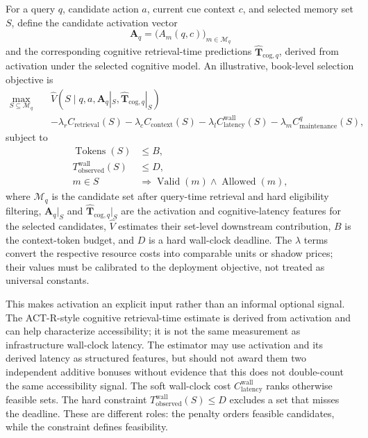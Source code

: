 For a query \(q\), candidate action \(a\), current cue context \(c\), and selected memory set \(S\), define the candidate activation vector
\[
  \mathbf A_q=\bigl(A_m(q,c)\bigr)_{m\in\mathcal M_q}
\]
and the corresponding cognitive retrieval-time predictions
\(\widehat{\mathbf T}_{\mathrm{cog},q}\), derived from activation under the selected cognitive model. An illustrative, book-level selection objective is
\begin{equation}
  \begin{split}
  \max_{S\subseteq\mathcal{M}_{q}}\quad
  &\widehat{V}\!\left(S\mid q,a,\mathbf A_q|_S,
       \widehat{\mathbf T}_{\mathrm{cog},q}|_S\right)\\
  &-\lambda_r C_{\mathrm{retrieval}}(S)
   -\lambda_c C_{\mathrm{context}}(S)
   -\lambda_l C_{\mathrm{latency}}^{\mathrm{wall}}(S)
   -\lambda_m C_{\mathrm{maintenance}}^{q}(S),
  \end{split}
  \label{eq:ch12-b1-objective}
\end{equation}
subject to
\begin{align}
  \operatorname{Tokens}(S)&\leq B,\\
  T_{\mathrm{observed}}^{\mathrm{wall}}(S)&\leq D,\\
  m\in S&\Rightarrow \operatorname{Valid}(m)\land\operatorname{Allowed}(m),
  \label{eq:ch12-b1-constraints}
\end{align}
where \(\mathcal M_q\) is the candidate set after query-time retrieval and hard eligibility filtering, \(\mathbf A_q|_S\) and \(\widehat{\mathbf T}_{\mathrm{cog},q}|_S\) are the activation and cognitive-latency features for the selected candidates, \(\widehat V\) estimates their set-level downstream contribution, \(B\) is the context-token budget, and \(D\) is a hard wall-clock deadline. The \(\lambda\) terms convert the respective resource costs into comparable units or shadow prices; their values must be calibrated to the deployment objective, not treated as universal constants.

This makes activation an explicit input rather than an informal optional signal. The ACT-R-style cognitive retrieval-time estimate is derived from activation and can help characterize accessibility; it is not the same measurement as infrastructure wall-clock latency. The estimator may use activation and its derived latency as structured features, but should not award them two independent additive bonuses without evidence that this does not double-count the same accessibility signal. The soft wall-clock cost \(C_{\mathrm{latency}}^{\mathrm{wall}}\) ranks otherwise feasible sets. The hard constraint \(T_{\mathrm{observed}}^{\mathrm{wall}}(S)\leq D\) excludes a set that misses the deadline. These are different roles: the penalty orders feasible candidates, while the constraint defines feasibility.

